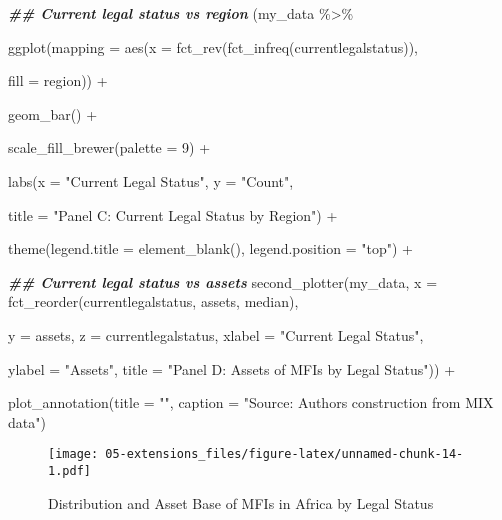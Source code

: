 \documentclass[a4paper,nobind]{templates/ociamthesis}
\newenvironment{Shaded}{\begin{snugshade}}{\end{snugshade}}
\newcommand{\AttributeTok}[1]{\textcolor[rgb]{0.77,0.63,0.00}{#1}}
\newcommand{\DecValTok}[1]{\textcolor[rgb]{0.00,0.00,0.81}{#1}}
\newcommand{\DocumentationTok}[1]{\textcolor[rgb]{0.56,0.35,0.01}{\textbf{\textit{#1}}}}
\newcommand{\FunctionTok}[1]{\textcolor[rgb]{0.00,0.00,0.00}{#1}}
\newcommand{\NormalTok}[1]{#1}
\newcommand{\SpecialCharTok}[1]{\textcolor[rgb]{0.00,0.00,0.00}{#1}}
\newcommand{\StringTok}[1]{\textcolor[rgb]{0.31,0.60,0.02}{#1}}
\renewenvironment{Shaded}
{
  \vspace{10pt}%
  \begin{snugshade}%
}{%
  \end{snugshade}%
  \vspace{8pt}%
}
\begin{document}
\begin{Shaded}
\begin{Highlighting}[]
\DocumentationTok{\#\# Current legal status vs region}
\NormalTok{(my\_data }\SpecialCharTok{\%\textgreater{}\%} 
  
\FunctionTok{ggplot}\NormalTok{(}\AttributeTok{mapping =} \FunctionTok{aes}\NormalTok{(}\AttributeTok{x =} \FunctionTok{fct\_rev}\NormalTok{(}\FunctionTok{fct\_infreq}\NormalTok{(currentlegalstatus)), }
                     
                     \AttributeTok{fill =}\NormalTok{ region)) }\SpecialCharTok{+} 
  
  \FunctionTok{geom\_bar}\NormalTok{() }\SpecialCharTok{+} 
  
  \FunctionTok{scale\_fill\_brewer}\NormalTok{(}\AttributeTok{palette =} \DecValTok{9}\NormalTok{) }\SpecialCharTok{+} 
  
  \FunctionTok{labs}\NormalTok{(}\AttributeTok{x =} \StringTok{"Current Legal Status"}\NormalTok{, }\AttributeTok{y =} \StringTok{"Count"}\NormalTok{, }
       
       \AttributeTok{title =} \StringTok{"Panel C: Current Legal Status by Region"}\NormalTok{) }\SpecialCharTok{+} 
  
  \FunctionTok{theme}\NormalTok{(}\AttributeTok{legend.title =} \FunctionTok{element\_blank}\NormalTok{(), }\AttributeTok{legend.position =} \StringTok{"top"}\NormalTok{) }\SpecialCharTok{+} 


\DocumentationTok{\#\# Current legal status vs assets}
\FunctionTok{second\_plotter}\NormalTok{(my\_data, }\AttributeTok{x =} \FunctionTok{fct\_reorder}\NormalTok{(currentlegalstatus, assets, median), }
           
          \AttributeTok{y =}\NormalTok{ assets, }\AttributeTok{z =}\NormalTok{ currentlegalstatus, }\AttributeTok{xlabel =} \StringTok{"Current Legal Status"}\NormalTok{, }
          
          \AttributeTok{ylabel =} \StringTok{"Assets"}\NormalTok{, }\AttributeTok{title =} \StringTok{"Panel D: Assets of MFIs by Legal Status"}\NormalTok{))  }\SpecialCharTok{+} 
  
  \FunctionTok{plot\_annotation}\NormalTok{(}\AttributeTok{title =} \StringTok{""}\NormalTok{, }\AttributeTok{caption =} \StringTok{"Source: Authors\textquotesingle{} construction from MIX data"}\NormalTok{)}
\end{Highlighting}
\end{Shaded}

\begin{figure}
\centering
\texttt{[image: 05-extensions\_files/figure-latex/unnamed-chunk-14-1.pdf]}
\caption{\label{fig:unnamed-chunk-14}Distribution and Asset Base of MFIs in Africa by Legal Status}
\end{figure}
\end{document}
